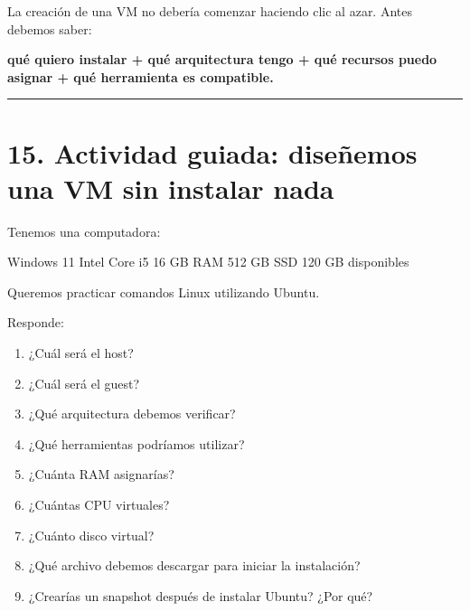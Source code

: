 \documentclass[
  spanish,
  letterpaper,
]{scrbook}
\newenvironment{Shaded}{\begin{snugshade}}{\end{snugshade}}
\newcommand{\NormalTok}[1]{\textcolor[rgb]{0.00,0.23,0.31}{#1}}
\providecommand{\tightlist}{%
  \setlength{\itemsep}{0pt}\setlength{\parskip}{0pt}}
\begin{document}
\begin{tcolorbox}[enhanced jigsaw, arc=.35mm, bottomrule=.15mm, bottomtitle=1mm, breakable, colback=white, colbacktitle=quarto-callout-important-color!10!white, colframe=quarto-callout-important-color-frame, coltitle=black, left=2mm, leftrule=.75mm, opacityback=0, opacitybacktitle=0.6, rightrule=.15mm, title=\textcolor{quarto-callout-important-color}{\faExclamation}\hspace{0.5em}{Primero diseñamos; después instalamos}, titlerule=0mm, toprule=.15mm, toptitle=1mm]

La creación de una VM no debería comenzar haciendo clic al azar. Antes
debemos saber:

\textbf{qué quiero instalar + qué arquitectura tengo + qué recursos
puedo asignar + qué herramienta es compatible.}

\end{tcolorbox}

\begin{center}\rule{0.5\linewidth}{0.5pt}\end{center}


\chapter{15. Actividad guiada: diseñemos una VM sin instalar
nada}\label{actividad-guiada-diseuxf1emos-una-vm-sin-instalar-nada}

Tenemos una computadora:

\begin{Shaded}
\begin{Highlighting}[]
\NormalTok{Windows 11}
\NormalTok{Intel Core i5}
\NormalTok{16 GB RAM}
\NormalTok{512 GB SSD}
\NormalTok{120 GB disponibles}
\end{Highlighting}
\end{Shaded}

Queremos practicar comandos Linux utilizando Ubuntu.

Responde:

\begin{enumerate}
\def\labelenumi{\arabic{enumi}.}
\tightlist
\item
  ¿Cuál será el host?
\item
  ¿Cuál será el guest?
\item
  ¿Qué arquitectura debemos verificar?
\item
  ¿Qué herramientas podríamos utilizar?
\item
  ¿Cuánta RAM asignarías?
\item
  ¿Cuántas CPU virtuales?
\item
  ¿Cuánto disco virtual?
\item
  ¿Qué archivo debemos descargar para iniciar la instalación?
\item
  ¿Crearías un snapshot después de instalar Ubuntu? ¿Por qué?
\end{enumerate}
\end{document}
